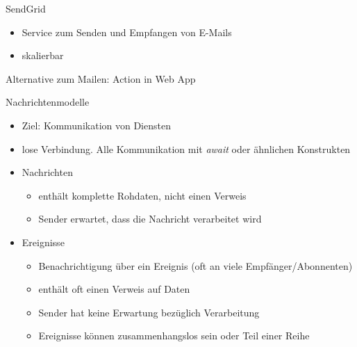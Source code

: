 
\begin{flashcard}[Definition]{SendGrid}
    \begin{itemize}
        \item Service zum Senden und Empfangen von E-Mails
        \item skalierbar
    \end{itemize}
    \vspace{1cm}
    Alternative zum Mailen: Action in Web App
\end{flashcard}

\begin{flashcard}[Definition]{Nachrichtenmodelle}
    \begin{itemize}
        \item Ziel: Kommunikation von Diensten
        \item lose Verbindung. Alle Kommunikation mit \emph{await} oder ähnlichen Konstrukten
        \item Nachrichten
            \begin{itemize}
                \item enthält komplette Rohdaten, nicht einen Verweis
                \item Sender erwartet, dass die Nachricht verarbeitet wird
            \end{itemize}
        \item Ereignisse
            \begin{itemize}
                \item Benachrichtigung über ein Ereignis (oft an viele Empfänger/Abonnenten)
                \item enthält oft einen Verweis auf Daten
                \item Sender hat keine Erwartung bezüglich Verarbeitung
                \item Ereignisse können zusammenhangslos sein oder Teil einer Reihe
            \end{itemize}
    \end{itemize}
\end{flashcard}

